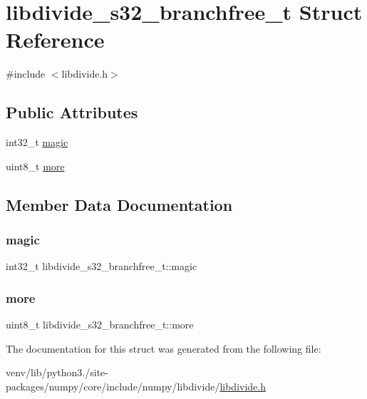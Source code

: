 \hypertarget{structlibdivide__s32__branchfree__t}{}\section{libdivide\+\_\+s32\+\_\+branchfree\+\_\+t Struct Reference}
\label{structlibdivide__s32__branchfree__t}


{\ttfamily \#include $<$libdivide.\+h$>$}

\subsection*{Public Attributes}
\begin{DoxyCompactItemize}
\item 
int32\+\_\+t \hyperlink{structlibdivide__s32__branchfree__t_a5c3ce2ddae6bf53c0fcd01a6cbf39300}{magic}
\item 
uint8\+\_\+t \hyperlink{structlibdivide__s32__branchfree__t_a2e38431d48dc7a6674ea628409eff8e8}{more}
\end{DoxyCompactItemize}


\subsection{Member Data Documentation}
\mbox{\label{structlibdivide__s32__branchfree__t_a5c3ce2ddae6bf53c0fcd01a6cbf39300}} 
\subsubsection{\texorpdfstring{magic}{magic}}
{\footnotesize\ttfamily int32\+\_\+t libdivide\+\_\+s32\+\_\+branchfree\+\_\+t\+::magic}

\mbox{\label{structlibdivide__s32__branchfree__t_a2e38431d48dc7a6674ea628409eff8e8}} 
\subsubsection{\texorpdfstring{more}{more}}
{\footnotesize\ttfamily uint8\+\_\+t libdivide\+\_\+s32\+\_\+branchfree\+\_\+t\+::more}



The documentation for this struct was generated from the following file\+:\begin{DoxyCompactItemize}
\item 
venv/lib/python3./site-\/packages/numpy/core/include/numpy/libdivide/\hyperlink{libdivide_8h}{libdivide.\+h}\end{DoxyCompactItemize}

